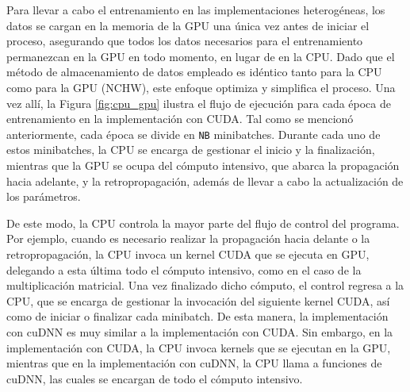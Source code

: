 Para llevar a cabo el entrenamiento en las implementaciones heterogéneas, los datos se cargan en la memoria de la GPU una única vez antes de iniciar el proceso, asegurando que todos los datos necesarios para el entrenamiento permanezcan en la GPU en todo momento, en lugar de en la CPU. Dado que el método de almacenamiento de datos empleado es idéntico tanto para la CPU como para la GPU (NCHW), este enfoque optimiza y simplifica el proceso. Una vez allí, la Figura \ref{fig:cpu_gpu} ilustra el flujo de ejecución para cada época de entrenamiento en la implementación con CUDA. Tal como se mencionó anteriormente, cada época se divide en \texttt{NB} minibatches. Durante cada uno de estos minibatches, la CPU se encarga de gestionar el inicio y la finalización, mientras que la GPU se ocupa del cómputo intensivo, que abarca la propagación hacia adelante, y la retropropagación, además de llevar a cabo la actualización de los parámetros.

De este modo, la CPU controla la mayor parte del flujo de control del programa. Por ejemplo, cuando es necesario realizar la propagación hacia delante o la retropropagación, la CPU invoca un kernel CUDA que se ejecuta en GPU, delegando a esta última todo el cómputo intensivo, como en el caso de la multiplicación matricial. Una vez finalizado dicho cómputo, el control regresa a la CPU, que se encarga de gestionar la invocación del siguiente kernel CUDA, así como de iniciar o finalizar cada minibatch. De esta manera, la implementación con cuDNN es muy similar a la implementación con CUDA. Sin embargo, en la implementación con CUDA, la CPU invoca kernels que se ejecutan en la GPU, mientras que en la implementación con cuDNN, la CPU llama a funciones de cuDNN, las cuales se encargan de todo el cómputo intensivo.
